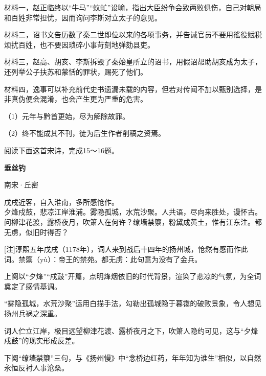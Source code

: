 \documentclass[11pt,a4paper]{ctexart}
\begin{document}
\begin{choices}
\item 材料一，赵正临终以“牛马”“蚊虻”设喻，指出大臣纷争会致两败俱伤，自己对朝局和百姓非常担忧，因而询问李斯对立太子的意见。
\item 材料二，诏书文告历数了秦二世即位以来的各项事务，并告诫官员不要用徭役赋税烦扰百姓，也不要因琐碎小事苛刻地弹劾县吏。
\item 材料三，赵高、胡亥、李斯拆毁了秦始皇所立的诏书，用假诏帮助胡亥成为太子，还列举公子扶苏和蒙恬的罪状，赐死了他们。
\item 材料四，逸事可以补充前代史书遗漏未载的内容，但若对传闻不加以甄别选择，是非真伪便会混淆，也会产生更为严重的危害。
\end{choices}


（1）元年与黔首更始，尽为解除故罪。

（2）终不能成其不刊，徒为后生作者削稿之资焉。


\par\vspace{2.2em}

阅读下面这首宋诗，完成15～16题。

\begin{center}{\bfseries 垂丝钓}\par\vspace{0.15em}南宋·丘密\end{center}

\begin{poem}
戊戌近客，自入淮南，多所感怆作。\\
夕烽戍鼓，悲凉江岸淮浦。雾隐孤城，水荒沙聚。人共语，尽向来胜处，谩怀古。\\
问柳津花渡，露桥夜月，吹箫人在何许？缭墙禁籞，粉黛成黄土，惟有江东注。都无虏，似旧时得否？
\end{poem}

[注]淳熙五年戊戌（1178年），词人来到战后十四年的扬州城，怆然有感而作此词。禁籞（yù）：帝王的禁苑。都无虏：此句意为没有了金兵。

\begin{choices}
\item 上阕以“夕烽”“戍鼓”开篇，点明烽烟依旧的时代背景，渲染了悲凉的气氛，为全词奠定了感情基调。
\item “雾隐孤城，水荒沙聚”运用白描手法，勾勒出孤城隐于暮霭的破败景象，令人想见扬州兵祸之深重。
\item 词人伫立江岸，极目远望柳津花渡、露桥夜月之下，吹箫人隐约可见，这与“夕烽戍鼓”的现实形成反差。
\item 下阕“缭墙禁籞”三句，与《扬州慢》中“念桥边红药，年年知为谁生”相似，以自然永恒反衬人事沧桑。
\end{choices}
\end{document}
